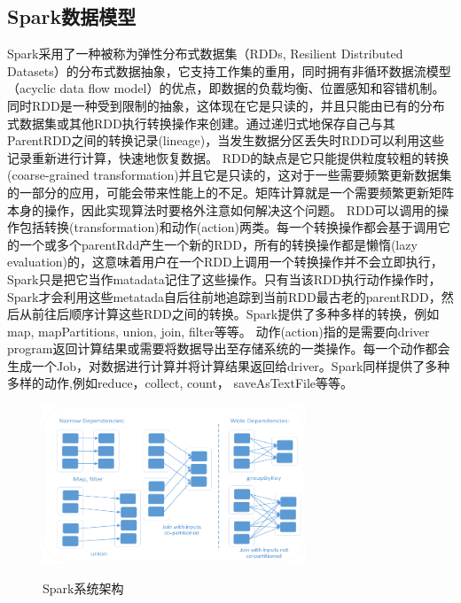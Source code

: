 \documentclass[master]{njuthesis}
\begin{document}
\subsection{Spark数据模型}
Spark采用了一种被称为弹性分布式数据集（RDDs, Resilient Distributed Datasets）的分布式数据抽象，它支持工作集的重用，同时拥有非循环数据流模型（acyclic data flow model）的优点，即数据的负载均衡、位置感知和容错机制。同时RDD是一种受到限制的抽象，这体现在它是只读的，并且只能由已有的分布式数据集或其他RDD执行转换操作来创建。通过递归式地保存自己与其ParentRDD之间的转换记录(lineage)，当发生数据分区丢失时RDD可以利用这些记录重新进行计算，快速地恢复数据。
RDD的缺点是它只能提供粒度较粗的转换(coarse-grained transformation)并且它是只读的，这对于一些需要频繁更新数据集的一部分的应用，可能会带来性能上的不足。矩阵计算就是一个需要频繁更新矩阵本身的操作，因此实现算法时要格外注意如何解决这个问题。
RDD可以调用的操作包括转换(transformation)和动作(action)两类。每一个转换操作都会基于调用它的一个或多个parentRdd产生一个新的RDD，所有的转换操作都是懒惰(lazy evaluation)的，这意味着用户在一个RDD上调用一个转换操作并不会立即执行，Spark只是把它当作matadata记住了这些操作。只有当该RDD执行动作操作时，Spark才会利用这些metatada自后往前地追踪到当前RDD最古老的parentRDD，然后从前往后顺序计算这些RDD之间的转换。Spark提供了多种多样的转换，例如map, mapPartitions, union, join, filter等等。
动作(action)指的是需要向driver program返回计算结果或需要将数据导出至存储系统的一类操作。每一个动作都会生成一个Job，对数据进行计算并将计算结果返回给driver。Spark同样提供了多种多样的动作,例如reduce，collect, count， saveAsTextFile等等。
\begin{figure}[htbp]
  \centering
  \includegraphics[width= 0.7\textwidth]{figure/rdd_dependency.png}\\
  \caption{Spark系统架构}\label{fig:rdd_dependency}
\end{figure}
\end{document}
